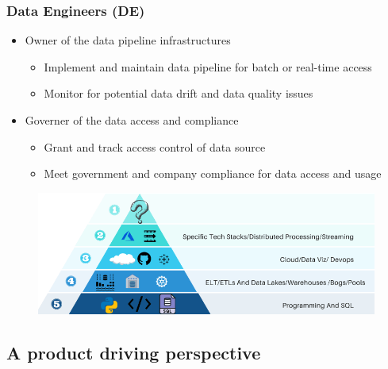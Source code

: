 \documentclass[aspectratio=169,xcolor=x11names,table]{beamer}
\begin{document}
\begin{frame}
	\frametitle{Data Engineers (DE)}
	\begin{itemize}
		\item Owner of the data pipeline infrastructures
			\begin{itemize}
				\item Implement and maintain data pipeline for batch or real-time access
				\item Monitor for potential data drift and data quality issues
			\end{itemize}
		\item Governer of the data access and compliance
			\begin{itemize}
				\item Grant and track access control of data source
				\item Meet government and company compliance for data access and usage
			\end{itemize}
	\end{itemize}
	\vfill
	\begin{figure}
		\centering
		\includegraphics[width=0.8\linewidth]{data_engineer}
	\end{figure}
\end{frame}


\subsection{A product driving perspective}
\end{document}
